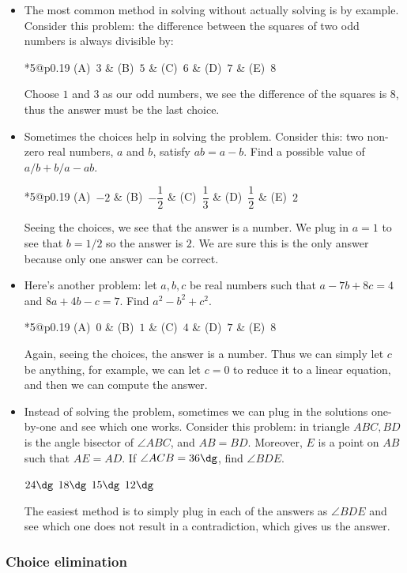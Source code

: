 \documentclass[10pt,paper=letter]{scrartcl}
\makeatletter
\newcommand{\fivech}[5]{
        \begin{tabular}{*{5}{@{}p{0.19\textwidth}}}
(A)~#1 & (B)~#2 & (C)~#3 & (D)~#4 & (E)~#5
        \end{tabular}}
\makeatother
\begin{document}
\begin{itemize}

\item The most common method in solving without actually solving is by example. Consider this problem: the difference between the squares of two odd numbers is always divisible by:

\fivech
{$3$}
{$5$}
{$6$}
{$7$}
{$8$}

Choose $1$ and $3$ as our odd numbers, we see the difference of the squares is $8$, thus the answer must be the last choice. 

\item Sometimes the choices help in solving the problem. Consider this: two non-zero real numbers, $a$ and $b$, satisfy $ab = a-b$. Find a possible value of $a/b + b/a - ab$.

\fivech
{$-2$}
{$-\dfrac{1}{2}$}
{$\dfrac{1}{3}$}
{$\dfrac{1}{2}$}
{$2$}

Seeing the choices, we see that the answer is a number. We plug in $a = 1$ to see that $b = 1/2$ so the answer is $2$. We are sure this is the only answer because only one answer can be correct.

\item Here's another problem: let $a, b, c$ be real numbers such that $a - 7b + 8c = 4$ and $8a + 4b - c = 7$. Find $a^2 - b^2 + c^2$.

\fivech
{$0$}
{$1$}
{$4$}
{$7$}
{$8$}

Again, seeing the choices, the answer is a number. Thus we can simply let $c$ be anything, for example, we can let $c = 0$ to reduce it to a linear equation, and then we can compute the answer.

\item Instead of solving the problem, sometimes we can plug in the solutions one-by-one and see which one works. Consider this problem: in triangle $ABC, BD$ is the angle bisector of $\angle ABC$, and $AB = BD$. Moreover, $E$ is a point on $AB$ such that $AE = AD$. If $\angle ACB = 36\dg$, find $\angle BDE$.

\fourch
{$24\dg$}
{$18\dg$}
{$15\dg$}
{$12\dg$}

The easiest method is to simply plug in each of the answers as $\angle BDE$ and see which one does not result in a contradiction, which gives us the answer.

\end{itemize}

\subsubsection*{Choice elimination}
\end{document}
